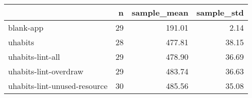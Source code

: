 \begin{tabular}{lrrr}
\toprule
{} &   n &  sample\_mean &  sample\_std \\
\midrule
blank-app                    &  29 &       191.01 &        2.14 \\
uhabits                      &  28 &       477.81 &       38.15 \\
uhabits-lint-all             &  29 &       478.90 &       36.69 \\
uhabits-lint-overdraw        &  29 &       483.74 &       36.63 \\
uhabits-lint-unused-resource &  30 &       485.56 &       35.08 \\
\bottomrule
\end{tabular}
